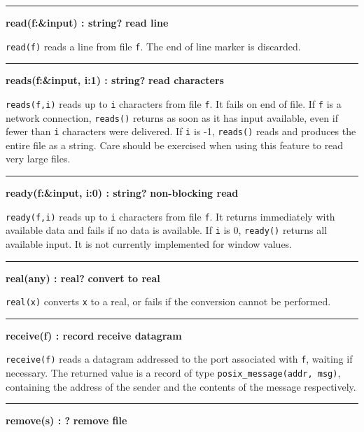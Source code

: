 \bigskip\hrule\vspace{0.1cm}
\noindent
{\bf read(f:\&input) : string? } \hfill {\bf read line}

\noindent
{}\texttt{read(f)} reads a line from file \texttt{f}. The
end of line marker is discarded.

\bigskip\hrule\vspace{0.1cm}
\noindent
{\bf reads(f:\&input, i:1) : string? } \hfill {\bf read characters}

\noindent
{}\texttt{reads(f,i)} reads up to \texttt{i} characters
from file \texttt{f}. It fails on end of file. If \texttt{f} is a
network connection, \texttt{reads()} returns as soon as it has input
available, even if fewer than \texttt{i} characters were delivered. If
\texttt{i} is -1, \texttt{reads()} reads and produces the entire file
as a string. Care should be exercised when using this feature to read
very large files.

\bigskip\hrule\vspace{0.1cm}
\noindent
{\bf ready(f:\&input, i:0) : string? } \hfill {\bf non{}-blocking read}

\noindent
{}\texttt{ready(f,i)} reads up to \texttt{i} characters
from file \texttt{f}. It returns immediately with available data and
fails if no data is available. If \texttt{i} is 0, \texttt{ready()}
returns all available input. It is not currently implemented for window
values.

\bigskip\hrule\vspace{0.1cm}
\noindent
{\bf real(any) : real? } \hfill {\bf convert to real}

\noindent
{}\texttt{real(x)} converts \texttt{x} to a real,
or fails if the conversion cannot be performed.

\bigskip\hrule\vspace{0.1cm}
\noindent
{\bf receive(f) : record } \hfill {\bf receive datagram}

\noindent
{}\texttt{receive(f)} reads a datagram addressed
to the port associated with \texttt{f}, waiting if necessary. The
returned value is a record of type \texttt{posix\_message(addr, msg)},
containing the address of the sender and the contents of the message
respectively. 

\bigskip\hrule\vspace{0.1cm}
\noindent
{\bf remove(s) : ? } \hfill {\bf remove file}

